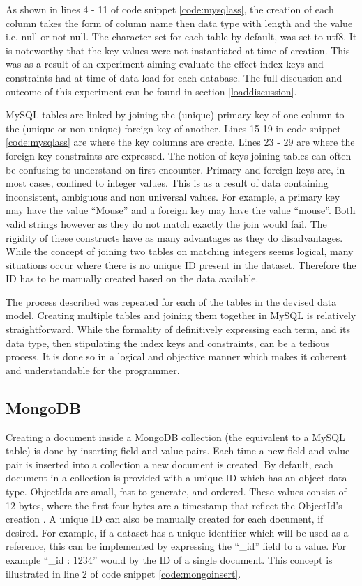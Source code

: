 As shown in lines 4 - 11 of code snippet \ref{code:mysqlass}, the creation of each column takes the form of column name then data type with length and the value i.e. null or not null. The character set for each table by default, was set to utf8. It is noteworthy that the key values were not  instantiated at time of creation. This was as a result of an experiment aiming evaluate the effect index keys and constraints had at time of data load for each database. The full discussion and outcome of this experiment can be found in section \ref{loaddiscussion}.

MySQL tables are linked by joining the (unique) primary key of one column to the (unique or non unique) foreign key of another. Lines 15-19 in code snippet \ref{code:mysqlass} are where the key columns are create. Lines 23 - 29 are where the foreign key constraints are expressed. The notion of keys joining tables can often be confusing to understand on first encounter. Primary and foreign keys are, in most cases, confined to integer values. This is as a result of data containing inconsistent, ambiguous and non universal values. For example, a primary key may have the value ``Mouse'' and a foreign key may have the value ``mouse''. Both valid strings however as they do not match exactly the join would fail. The rigidity of these constructs have as many advantages as they do disadvantages. While the concept of joining two tables on matching integers seems logical, many situations occur where there is no unique ID present in the dataset. Therefore the ID has to be manually created based on the data available.

The process described was repeated for each of the tables in the devised data model. Creating multiple tables and joining them together in MySQL is relatively straightforward. While the formality of definitively expressing each term, and its data type, then stipulating the index keys and constraints, can be a tedious process. It is done so in a logical and objective manner which makes it coherent and understandable for the programmer.

\subsection{MongoDB}\label{mongocreate}
Creating a document inside a MongoDB collection (the equivalent to a MySQL table) is done by inserting field and value pairs. Each time a new field and value pair is inserted into a collection a new document is created. By default, each document in a collection is provided with a unique ID which has an object data type. ObjectIds are small, fast to generate, and ordered. These values consist of 12-bytes, where the first four bytes are a timestamp that reflect the ObjectId's creation \cite{md}. A unique ID can also be manually created for each document, if desired. For example, if a dataset has a unique identifier which will be used as a reference, this can be implemented by expressing the ``\_id'' field to a value. For example ``\_id : 1234'' would by the ID of a single document. This concept is illustrated in line 2 of code snippet \ref{code:mongoinsert}.

